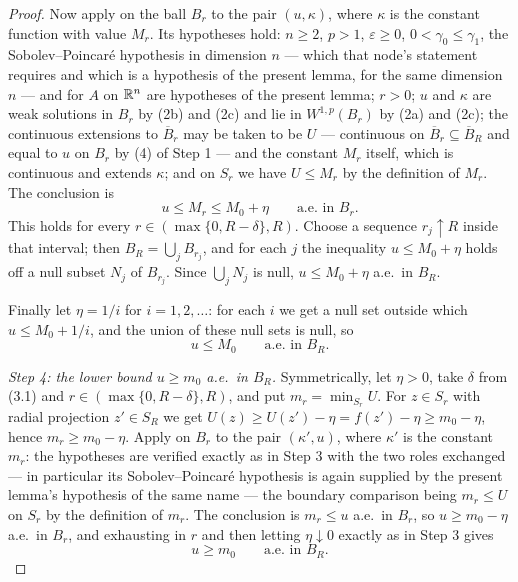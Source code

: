 \begin{proof}
Now apply  on the ball $B_r$ to the pair
$(u,\kappa)$, where $\kappa$ is the constant function with value $M_r$.  Its
hypotheses hold: $n\ge2$, $p>1$, $\varepsilon\ge0$, $0<\gamma_0\le\gamma_1$, the
Sobolev--Poincar\'e hypothesis  in dimension
$n$ --- which that node's statement requires and which is a hypothesis of the
present lemma, for the same dimension $n$ --- and
 for $A$ on $\mathbb{R}^n$ are hypotheses of the present
lemma; $r>0$; $u$ and $\kappa$ are weak solutions in $B_r$ by (2b) and (2c) and
lie in $W^{1,p}(B_r)$ by (2a) and (2c); the continuous extensions to
$\overline B_r$ may be taken to be $U$ --- continuous on
$\overline B_r\subseteq\overline B_R$ and equal to $u$ on $B_r$ by (4) of Step 1
--- and the constant $M_r$ itself, which is continuous and extends $\kappa$; and
on $S_r$ we have $U\le M_r$ by the definition of $M_r$.  The conclusion is
\[
u\le M_r\le M_0+\eta\qquad\text{a.e.\ in }B_r .
\]
This holds for every $r\in(\max\{0,R-\delta\},R)$.  Choose a sequence
$r_j\uparrow R$ inside that interval; then $B_R=\bigcup_jB_{r_j}$, and for each
$j$ the inequality $u\le M_0+\eta$ holds off a null subset $N_j$ of $B_{r_j}$.
Since $\bigcup_jN_j$ is null, $u\le M_0+\eta$ a.e.\ in $B_R$.

Finally let $\eta=1/i$ for $i=1,2,\dots$: for each $i$ we get a null set outside
which $u\le M_0+1/i$, and the union of these null sets is null, so
\[
u\le M_0\qquad\text{a.e.\ in }B_R .
\tag{3.2}
\]

\emph{Step 4: the lower bound $u\ge m_0$ a.e.\ in $B_R$.}  Symmetrically, let
$\eta>0$, take $\delta$ from (3.1) and $r\in(\max\{0,R-\delta\},R)$, and put
$m_r=\min_{S_r}U$.  For $z\in S_r$ with radial projection $z'\in S_R$ we get
$U(z)\ge U(z')-\eta=f(z')-\eta\ge m_0-\eta$, hence $m_r\ge m_0-\eta$.  Apply
 on $B_r$ to the pair $(\kappa',u)$, where
$\kappa'$ is the constant $m_r$: the hypotheses are verified exactly as in Step 3
with the two roles exchanged --- in particular its Sobolev--Poincar\'e hypothesis
 is again supplied by the present lemma's
hypothesis of the same name --- the boundary comparison being $m_r\le U$ on $S_r$
by the definition of $m_r$.  The conclusion is $m_r\le u$ a.e.\ in $B_r$, so
$u\ge m_0-\eta$ a.e.\ in $B_r$, and exhausting in $r$ and then letting
$\eta\downarrow0$ exactly as in Step 3 gives
\[
u\ge m_0\qquad\text{a.e.\ in }B_R .
\tag{3.3}
\]


\end{proof}
